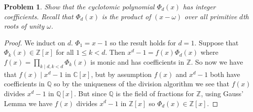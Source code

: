 \documentclass{article}
\newtheorem{problem}{Problem}
\begin{document}
\begin{problem}
Show that the cyclotomic polynomial $\Phi_d(x)$ has integer coefficients. Recall that $\Phi_d(x)$ is the product of $(x - \omega)$ over all primitive $d$th roots of unity $\omega$.
\end{problem}
\begin{proof}
We induct on $d$. $\Phi_1 = x-1$ so the result holds for $d = 1$. Suppose that $\Phi_k (x) \in \mathbb{Z}[x]$ for all $1 \leq k < d$. Then $x^d - 1 = f(x) \Phi_d(x)$ where $f(x) = \prod_{k \mid d, k < d} \Phi_k (x)$ is monic and has coefficients in $\mathbb{Z}$. So now we have that $f(x) \mid x^d - 1$ in $\mathbb{C}[x]$, but by assumption $f(x)$ and $x^d - 1$ both have coefficients in $\mathbb{Q}$ so by the uniqueness of the division algorithm we see that $f(x)$ divides $x^d - 1$ in $\mathbb{Q}[x]$. But since $\mathbb{Q}$ is the field of fractions for $\mathbb{Z}$, using Gauss' Lemma we have $f(x)$ divides $x^d-1$ in $\mathbb{Z}[x]$ so $\Phi_d(x) \in \mathbb{Z}[x]$.
\end{proof}
\end{document}
